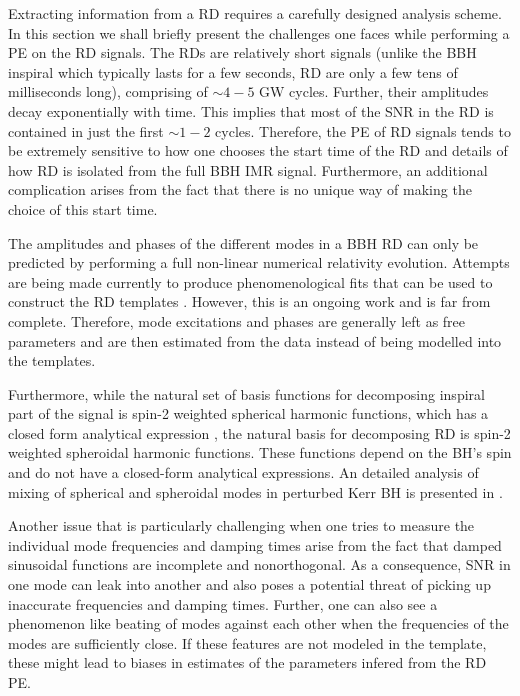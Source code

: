 Extracting information from a RD requires a carefully designed analysis scheme. In this section we shall briefly present the challenges one faces while performing a PE on the RD signals. The RDs are relatively short signals (unlike the BBH inspiral which typically lasts for a few seconds, RD are only a few tens of milliseconds long), comprising of $\sim 4-5$ GW cycles. Further, their amplitudes decay exponentially with time. This implies that most of the SNR in the RD is contained in just the first $\sim 1-2$ cycles. Therefore, the PE of RD signals tends to be extremely sensitive to how one chooses the start time of the RD and details of how RD is isolated from the full BBH IMR signal. Furthermore, an additional complication arises from the fact that there is no unique way of making the choice of this start time.

The amplitudes and phases of the different modes in a BBH RD can only be predicted by performing a full non-linear numerical relativity evolution. Attempts are being made currently to produce phenomenological fits that can be used to construct the RD templates \cite{London2,London}. However, this is an ongoing work and is far from complete. Therefore, mode excitations and phases are generally left as free parameters and are then estimated from the data instead of being modelled into the templates. 

Furthermore, while the natural set of basis functions for decomposing inspiral part of the signal is spin-2 weighted spherical harmonic functions, which has a closed form analytical expression \cite{2016JMP....57i2504B, }, the natural basis for decomposing RD is spin-2 weighted spheroidal harmonic functions. These functions depend on the BH's spin and do not have a closed-form analytical expressions. An detailed analysis of  mixing of spherical and spheroidal modes in perturbed Kerr BH is presented in \cite{2014PhRvD..90f4012B}. 

Another issue that is particularly challenging when one tries to measure the individual mode frequencies and damping times arise from the fact that damped sinusoidal functions are incomplete and nonorthogonal. As a consequence, SNR in one mode can leak into another and also poses a potential threat of picking up inaccurate frequencies and damping times. Further, one can also see a phenomenon like beating of modes against each other when the frequencies of the modes are sufficiently close. If these features are not modeled in the template, these might lead to biases in estimates of the parameters infered from the RD PE. 


